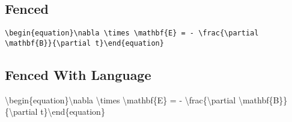 \documentclass[]{article}
\newenvironment{Shaded}{}{}
\newcommand{\NormalTok}[1]{{#1}}
\begin{document}
\subsection{Fenced}\label{fenced}

\begin{verbatim}
\begin{equation}\nabla \times \mathbf{E} = - \frac{\partial \mathbf{B}}{\partial t}\end{equation}
\end{verbatim}

\subsection{Fenced With Language}\label{fenced-with-language}

\begin{Shaded}
\begin{Highlighting}[]
\NormalTok{\textbackslash{}begin\{equation\}\textbackslash{}nabla \textbackslash{}times \textbackslash{}mathbf\{E\} = - \textbackslash{}frac\{\textbackslash{}partial \textbackslash{}mathbf\{B\}\}\{\textbackslash{}partial t\}\textbackslash{}end\{equation\}}
\end{Highlighting}
\end{Shaded}
\end{document}
